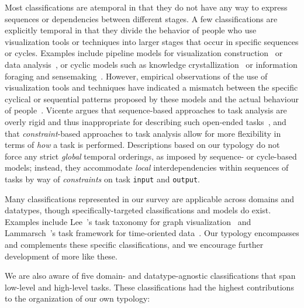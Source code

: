 Most classifications are atemporal in that they do not have any way to express sequences or dependencies between different stages.
A few classifications are explicitly temporal in that they divide the behavior of people who use visualization tools or techniques into larger stages that occur in specific sequences or cycles.
Examples include pipeline models for visualization construction~\cite{Chi1998} or data analysis~\cite{Kandel2012}, or cyclic models such as knowledge crystallization~\cite{Card1999} or information foraging and sensemaking~\cite{Pirolli2005}.
However, empirical observations of the use of visualization tools and techniques have indicated a mismatch between the specific cyclical or sequential patterns proposed by these models and the actual behaviour of people~\cite{Isenberg2008a}.
Vicente argues that sequence-based approaches to task analysis are overly rigid and thus inappropriate for describing such open-ended tasks~\cite{Vicente1999}, and that {\it constraint}-based approaches to task analysis allow for more flexibility in terms of {\it how} a task is performed.
Descriptions based on our typology do not force any strict {\it global} temporal orderings, as imposed by sequence- or cycle-based models; instead, they accommodate {\it local} interdependencies within sequences of tasks by way of {\it constraints} on task {\tt input} and {\tt output}.

Many classifications represented in our survey are applicable across domains and datatypes, though specifically-targeted classifications and models do exist.
Examples include Lee~\etal's task taxonomy for graph visualization~\cite{Lee2006} and Lammarsch~\etal's task framework for time-oriented data~\cite{Lammarsch2012}. 
Our typology encompasses and complements these specific classifications, and we encourage further development of more like these.

We are also aware of five domain- and datatype-agnostic classifications that span low-level and high-level tasks.
These classifications had the highest contributions to the organization of our own typology:

